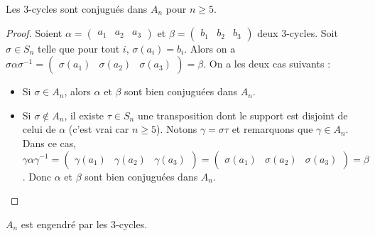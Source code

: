 





	\begin{lemma}
		\label{simplicite-du-groupe-alterne-1}
		Les $3$-cycles sont conjugués dans $A_n$ pour $n \geq 5$.
	\end{lemma}

	\begin{proof}
		Soient $\alpha = \begin{pmatrix} a_1 & a_2 & a_3 \end{pmatrix}$ et $\beta = \begin{pmatrix} b_1 & b_2 & b_3 \end{pmatrix}$ deux $3$-cycles. Soit $\sigma \in S_n$ telle que pour tout $i$, $\sigma(a_i) = b_i$. Alors on a $\sigma \alpha \sigma^{-1} = \begin{pmatrix} \sigma(a_1) & \sigma(a_2) & \sigma(a_3) \end{pmatrix} = \beta$. On a les deux cas suivants :
		\begin{itemize}
			\item Si $\sigma \in A_n$, alors $\alpha$ et $\beta$ sont bien conjuguées dans $A_n$.
			\item Si $\sigma \notin A_n$, il existe $\tau \in S_n$ une transposition dont le support est disjoint de celui de $\alpha$ (c'est vrai car $n \geq 5$). Notons $\gamma = \sigma \tau$ et remarquons que $\gamma \in A_n$. Dans ce cas, $\gamma \alpha \gamma^{-1} = \begin{pmatrix} \gamma(a_1) & \gamma(a_2) & \gamma(a_3) \end{pmatrix} = \begin{pmatrix} \sigma(a_1) & \sigma(a_2) & \sigma(a_3) \end{pmatrix} = \beta$. Donc $\alpha$ et $\beta$ sont bien conjuguées dans $A_n$.
		\end{itemize}
	\end{proof}
	

	\begin{lemma}
		\label{simplicite-du-groupe-alterne-2}
		$A_n$ est engendré par les $3$-cycles.
	\end{lemma}


